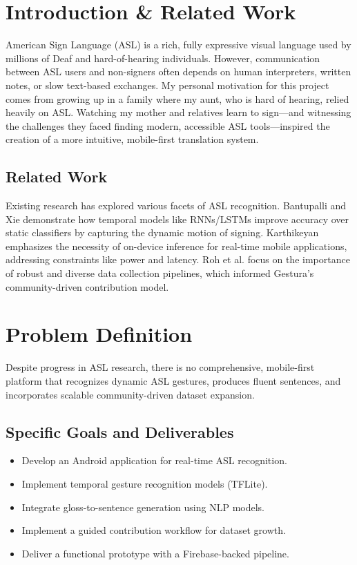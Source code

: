 \documentclass[12pt,a4paper]{article}
\begin{document}
\newpage

\tableofcontents
\newpage

\section{Introduction \& Related Work}
American Sign Language (ASL) is a rich, fully expressive visual language used by millions of Deaf and hard-of-hearing individuals. However, communication between ASL users and non-signers often depends on human interpreters, written notes, or slow text-based exchanges. My personal motivation for this project comes from growing up in a family where my aunt, who is hard of hearing, relied heavily on ASL. Watching my mother and relatives learn to sign—and witnessing the challenges they faced finding modern, accessible ASL tools—inspired the creation of a more intuitive, mobile-first translation system.

\subsection{Related Work}
Existing research has explored various facets of ASL recognition. Bantupalli and Xie \cite{bantupalli2018asl} demonstrate how temporal models like RNNs/LSTMs improve accuracy over static classifiers by capturing the dynamic motion of signing. Karthikeyan \cite{karthikeyan2018mlmobile} emphasizes the necessity of on-device inference for real-time mobile applications, addressing constraints like power and latency. Roh et al. \cite{roh2021data} focus on the importance of robust and diverse data collection pipelines, which informed Gestura's community-driven contribution model.

\section{Problem Definition}
Despite progress in ASL research, there is no comprehensive, mobile-first platform that recognizes dynamic ASL gestures, produces fluent sentences, and incorporates scalable community-driven dataset expansion.

\subsection{Specific Goals and Deliverables}
\begin{itemize}
    \item Develop an Android application for real-time ASL recognition.
    \item Implement temporal gesture recognition models (TFLite).
    \item Integrate gloss-to-sentence generation using NLP models.
    \item Implement a guided contribution workflow for dataset growth.
    \item Deliver a functional prototype with a Firebase-backed pipeline.
\end{itemize}
\end{document}
